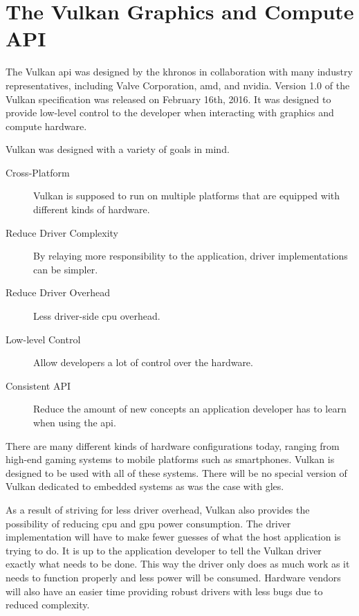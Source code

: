 


  \section{The Vulkan Graphics and Compute API}
    The Vulkan \gls{api} was designed by the \gls{khronos} in collaboration with many industry representatives, including Valve Corporation, \gls{amd}, and \gls{nvidia}\cite{vkspec}.
    Version 1.0 of the Vulkan specification was released on February 16th, 2016\cite{vkrelease1dot0}.
    It was designed to provide low-level control to the developer when interacting with graphics and compute hardware.

    Vulkan was designed with a variety of goals in mind.

    \begin{description}
      \item[Cross-Platform] Vulkan is supposed to run on multiple platforms that are equipped with different kinds of hardware.
      \item[Reduce Driver Complexity] By relaying more responsibility to the application, driver implementations can be simpler.
      \item[Reduce Driver Overhead] Less driver-side \gls{cpu} overhead.
      \item[Low-level Control] Allow developers a lot of control over the hardware.
      \item[Consistent API] Reduce the amount of new concepts an application developer has to learn when using the \gls{api}.
    \end{description}

    There are many different kinds of hardware configurations today, ranging from high-end gaming systems to mobile platforms such as smartphones.
    Vulkan is designed to be used with all of these systems.
    There will be no special version of Vulkan dedicated to embedded systems as was the case with \gls{gles}.

    As a result of striving for less driver overhead, Vulkan also provides the possibility of reducing \gls{cpu} and \gls{gpu} power consumption.
    The driver implementation will have to make fewer guesses of what the host application is trying to do.
    It is up to the application developer to tell the Vulkan driver exactly what needs to be done.
    This way the driver only does as much work as it needs to function properly and less power will be consumed.
    Hardware vendors will also have an easier time providing robust drivers with less bugs due to reduced complexity.

